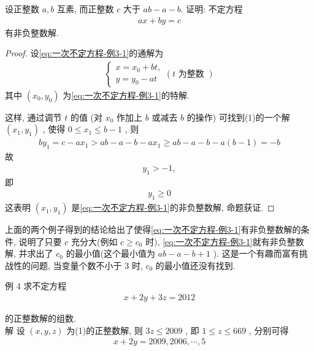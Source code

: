 \begin{example}
	设正整数 $a ,  b$ 互素, 而正整数 $c$ 大于 $a b-a-b$. 证明: 不定方程
	\begin{align}\label{eq:一次不定方程-例3-1}
		a x+b y=c
	\end{align}
	有非负整数解.
\end{example}
\begin{proof}
	设\autoref{eq:一次不定方程-例3-1}的通解为
	\begin{align*}
		\left\{\begin{array}{l}
			       x=x_{0}+b t, \\
			       y=y_{0}-a t
		       \end{array}(t \text { 为整数 })\right.
	\end{align*}
	其中 $\left(x_{0}, y_{0}\right)$ 为\autoref{eq:一次不定方程-例3-1}的特解.

	这样, 通过调节 $t$ 的值 (对 $x_{0}$ 作加上 $b$ 或减去 $b$ 的操作) 可找到(1)的一个解 $\left(x_{1}, y_{1}\right)$ , 使得 $0 \leqslant x_{1} \leqslant b-1$ , 则
	\begin{align*}
		b y_{1}=c-a x_{1}>a b-a-b-a x_{1} \geqslant a b-a-b-a(b-1)=-b
	\end{align*}
	故
	\begin{align*}
		y_{1}>-1,
	\end{align*}
	即
	\begin{align*}
		y_{1} \geqslant 0
	\end{align*}
	这表明 $\left(x_{1}, y_{1}\right)$ 是\autoref{eq:一次不定方程-例3-1}的非负整数解, 命题获证.
\end{proof}
\begin{note}
	上面的两个例子得到的结论给出了使得\autoref{eq:一次不定方程-例3-1}有非负整数解的条件, 说明了只要 $c$ 充分大(例如 $c \geqslant c_{0}$ 时), \autoref{eq:一次不定方程-例3-1}就有非负整数解, 并求出了 $c_{0}$ 的最小值(这个最小值为 $a b-a-b+1$ ). 这是一个有趣而富有挑战性的问题, 当变量个数不小于 3 时, $c_{0}$ 的最小值还没有找到.
\end{note}

例 4 求不定方程
\begin{align*}
	x+2 y+3 z=2012
\end{align*}

的正整数解的组数.\\
解 设 $(x, y, z)$ 为(1)的正整数解, 则 $3 z \leqslant 2009$ , 即 $1 \leqslant z \leqslant 669$ , 分别可得
\begin{align*}
	x+2 y=2009,2006, \cdots, 5
\end{align*}

